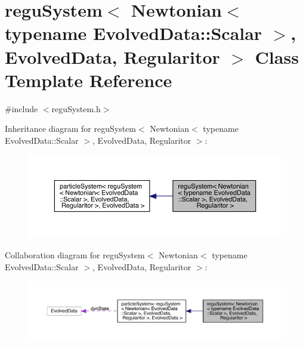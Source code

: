 \hypertarget{classregu_system_3_01_newtonian_3_01typename_01_evolved_data_1_1_scalar_01_4_00_01_evolved_data_00_01_regularitor_01_4}{}\section{regu\+System$<$ Newtonian$<$ typename Evolved\+Data\+:\+:Scalar $>$, Evolved\+Data, Regularitor $>$ Class Template Reference}
\label{classregu_system_3_01_newtonian_3_01typename_01_evolved_data_1_1_scalar_01_4_00_01_evolved_data_00_01_regularitor_01_4}


{\ttfamily \#include $<$regu\+System.\+h$>$}



Inheritance diagram for regu\+System$<$ Newtonian$<$ typename Evolved\+Data\+:\+:Scalar $>$, Evolved\+Data, Regularitor $>$\+:\nopagebreak
\begin{figure}[H]
\begin{center}
\leavevmode
\includegraphics[width=350pt]{classregu_system_3_01_newtonian_3_01typename_01_evolved_data_1_1_scalar_01_4_00_01_evolved_data_c2749d44fe7bf9b2389e9de4efb95e1b}
\end{center}
\end{figure}


Collaboration diagram for regu\+System$<$ Newtonian$<$ typename Evolved\+Data\+:\+:Scalar $>$, Evolved\+Data, Regularitor $>$\+:\nopagebreak
\begin{figure}[H]
\begin{center}
\leavevmode
\includegraphics[width=350pt]{classregu_system_3_01_newtonian_3_01typename_01_evolved_data_1_1_scalar_01_4_00_01_evolved_data_ab8a227f22946e01b399bfcd69c7be8d}
\end{center}
\end{figure}

